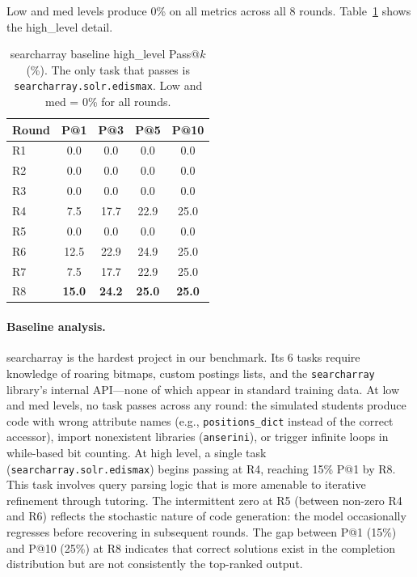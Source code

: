 \documentclass[11pt]{article}
\begin{document}
Low and med levels produce 0\% on all metrics across all 8 rounds. Table~\ref{tab:app-sa-bl} shows the high\_level detail.

\begin{table}[h]
  \centering
  \small
  \begin{tabular}{lcccc}
    \toprule
    \textbf{Round} & \textbf{P@1} & \textbf{P@3} & \textbf{P@5} & \textbf{P@10} \\
    \midrule
    R1 & 0.0 & 0.0 & 0.0 & 0.0 \\
    R2 & 0.0 & 0.0 & 0.0 & 0.0 \\
    R3 & 0.0 & 0.0 & 0.0 & 0.0 \\
    R4 & 7.5 & 17.7 & 22.9 & 25.0 \\
    R5 & 0.0 & 0.0 & 0.0 & 0.0 \\
    R6 & 12.5 & 22.9 & 24.9 & 25.0 \\
    R7 & 7.5 & 17.7 & 22.9 & 25.0 \\
    R8 & \textbf{15.0} & \textbf{24.2} & \textbf{25.0} & \textbf{25.0} \\
    \bottomrule
  \end{tabular}
  \caption{searcharray baseline high\_level Pass@$k$ (\%). The only task that passes is \texttt{searcharray.solr.edismax}. Low and med = 0\% for all rounds.}
  \label{tab:app-sa-bl}
\end{table}

\paragraph{Baseline analysis.} searcharray is the hardest project in our benchmark. Its 6 tasks require knowledge of roaring bitmaps, custom postings lists, and the \texttt{searcharray} library's internal API---none of which appear in standard training data. At low and med levels, no task passes across any round: the simulated students produce code with wrong attribute names (e.g., \texttt{positions\_dict} instead of the correct accessor), import nonexistent libraries (\texttt{anserini}), or trigger infinite loops in while-based bit counting. At high level, a single task (\texttt{searcharray.solr.edismax}) begins passing at R4, reaching 15\% P@1 by R8. This task involves query parsing logic that is more amenable to iterative refinement through tutoring. The intermittent zero at R5 (between non-zero R4 and R6) reflects the stochastic nature of code generation: the model occasionally regresses before recovering in subsequent rounds. The gap between P@1 (15\%) and P@10 (25\%) at R8 indicates that correct solutions exist in the completion distribution but are not consistently the top-ranked output.
\end{document}

